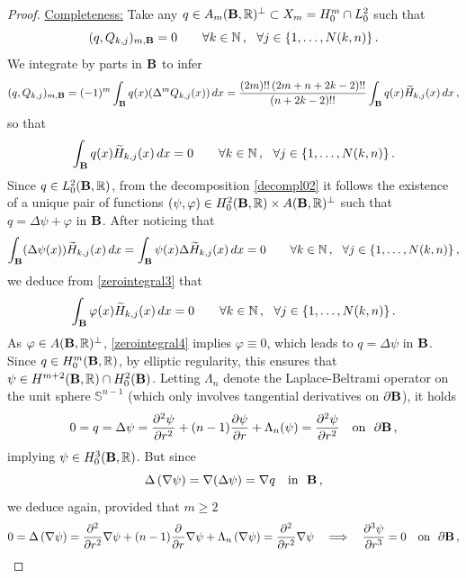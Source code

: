\documentclass[11pt]{article}
\theoremstyle{plain}
\theoremstyle{definition}
\numberwithin{equation}{section}
\newcommand{\B}{{\bf B}}
\renewcommand{\phi}{\varphi}
\begin{document}
\begin{proof}
\underline{Completeness:} Take any $q \in A_{m}(\B, \mathbb{R})^{\perp}\subset X_m= H^m_0\cap L^2_0$ such that
\begin{equation} \label{zerointegral2}
	(q, Q_{k,j})_{m, \B} = 0 \qquad \forall k \in \mathbb{N} \, , \ \ \forall j \in \{1,\ldots,N(k,n)\} \, .
\end{equation}
We integrate by parts in $\B$ to infer
$$
	(q, Q_{k,j})_{m, \B} = (-1)^{m} \int_{\B} q(x) (\Delta^{m} Q_{k,j}(x)) \, dx = \dfrac{(2m)!! \, (2m+n+2k-2)!!}{(n+2k-2)!!} \int_{\B} q(x) \widetilde{H}_{k,j}(x) \, dx \, ,
$$
so that
\begin{equation} \label{zerointegral3}
	\int_{\B} q(x) \widetilde{H}_{k,j}(x) \, dx = 0 \qquad \forall k \in \mathbb{N} \, , \ \ \forall j \in \{1,\ldots,N(k,n)\} \, .
\end{equation}
Since $q \in L_{0}^{2}(\B, \mathbb{R})$, from the decomposition \eqref{decompl02} it follows the existence of a unique pair of functions $(\psi, \phi) \in H_{0}^{2}(\B, \mathbb{R}) \times A(\B, \mathbb{R})^{\perp}$ such that $q = \Delta \psi + \phi$ in $\B$. After noticing that
$$
\int_{\B} (\Delta \psi(x)) \widetilde{H}_{k,j}(x) \, dx = \int_{\B} \psi(x) \Delta \widetilde{H}_{k,j}(x)  \, dx = 0 \qquad \forall k \in \mathbb{N} \, , \ \ \forall j \in \{1,\ldots,N(k,n)\} \, ,
$$
we deduce from \eqref{zerointegral3} that
\begin{equation} \label{zerointegral4}
	\int_{\B} \phi(x) \widetilde{H}_{k,j}(x) \, dx = 0 \qquad \forall k \in \mathbb{N} \, , \ \ \forall j \in \{1,\ldots,N(k,n)\} \, .
\end{equation}
As $\phi \in A(\B, \mathbb{R})^{\perp}$, \eqref{zerointegral4} implies $\phi \equiv 0$, which leads to $q = \Delta \psi$ in $\B$. Since $q \in H_{0}^{m}(\B, \mathbb{R})$, by elliptic regularity, this ensures that
$\psi \in H^{m+2}(\B, \mathbb{R}) \cap H_{0}^{2}(\B)$. Letting $\Lambda_{n}$ denote the Laplace-Beltrami operator on the unit sphere $\mathbb{S}^{n-1}$ (which only involves tangential derivatives on $\partial \B$), it holds
$$
0 =q= \Delta \psi = \dfrac{\partial^{2} \psi}{\partial r^{2}} + (n-1) \dfrac{\partial \psi}{\partial r} + \Lambda_{n}(\psi) = \dfrac{\partial^{2} \psi}{\partial r^{2}} \quad \text{on} \ \ \partial \B \, ,
$$
implying $\psi \in H_{0}^{3}(\B, \mathbb{R})$. But since
$$
\Delta \left(\nabla \psi \right) = \nabla (\Delta \psi) = \nabla q\quad \text{in} \ \ \B \, ,
$$
we deduce again, provided that $m\ge 2$
$$
0 = \Delta \left(\nabla \psi  \right)  = \dfrac{\partial^{2} }{\partial r^{2}}\nabla \psi  + (n-1) \dfrac{\partial }{\partial r} \nabla \psi + \Lambda_{n}\left(\nabla \psi  \right) = \dfrac{\partial^{2} }{\partial r^{2}}\nabla \psi \quad \Longrightarrow\quad \dfrac{\partial^{3} \psi}{\partial r^{3}}=0  \quad \text{on} \ \ \partial \B \, ,
$$
\end{proof}
\end{document}
